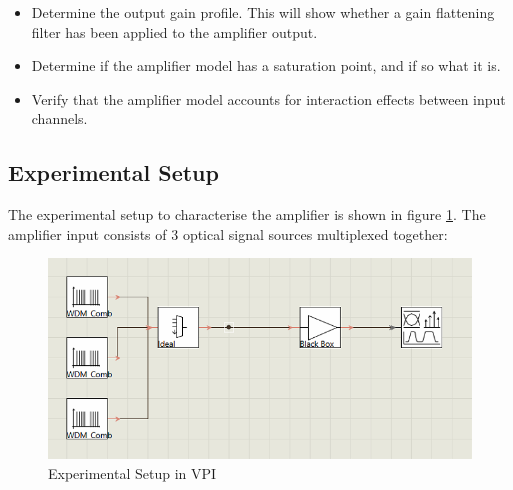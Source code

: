 \begin{itemize}    
    \item Determine the output gain profile. This will show whether a gain flattening filter has been applied to the amplifier output.\\

    \item Determine if the amplifier model has a saturation point, and if so what it is.\\
    
    \item Verify that the amplifier model accounts for interaction effects between input channels.\\
\end{itemize}





\subsection{Experimental Setup}
The experimental setup to characterise the amplifier is shown in figure \ref{fig:tw_amp_char}.
The amplifier input consists of 3 optical signal sources multiplexed together:

\begin{figure}
    \centering
    \includegraphics[width=\linewidth]{images/technical_work/section_1_characterisation/amp_char_ex_setup.png}
    \caption{Experimental Setup in VPI}
    \label{fig:tw_amp_char}
\end{figure}


